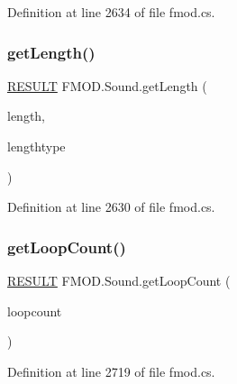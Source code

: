Definition at line 2634 of file fmod.\+cs.

\mbox{\label{class_f_m_o_d_1_1_sound_a8112459af81ffa81fff8ad3d2e8589b3}} 
\subsubsection{\texorpdfstring{get\+Length()}{getLength()}}
{\footnotesize\ttfamily \hyperlink{namespace_f_m_o_d_a305d1176ef3f8c8815861a60407ac33d}{R\+E\+S\+U\+LT} F\+M\+O\+D.\+Sound.\+get\+Length (\begin{DoxyParamCaption}\item[{out uint}]{length,  }\item[{\hyperlink{namespace_f_m_o_d_aff20975332f93ff2180d2681cb43929f}{T\+I\+M\+E\+U\+N\+IT}}]{lengthtype }\end{DoxyParamCaption})}



Definition at line 2630 of file fmod.\+cs.

\mbox{\label{class_f_m_o_d_1_1_sound_aef41e2f4f4c2d0821786f26a477d2428}} 
\subsubsection{\texorpdfstring{get\+Loop\+Count()}{getLoopCount()}}
{\footnotesize\ttfamily \hyperlink{namespace_f_m_o_d_a305d1176ef3f8c8815861a60407ac33d}{R\+E\+S\+U\+LT} F\+M\+O\+D.\+Sound.\+get\+Loop\+Count (\begin{DoxyParamCaption}\item[{out int}]{loopcount }\end{DoxyParamCaption})}



Definition at line 2719 of file fmod.\+cs.

\mbox{\label{class_f_m_o_d_1_1_sound_a76dcdfc403e81c47fdf9ba2e8fd9aa5d}} 
